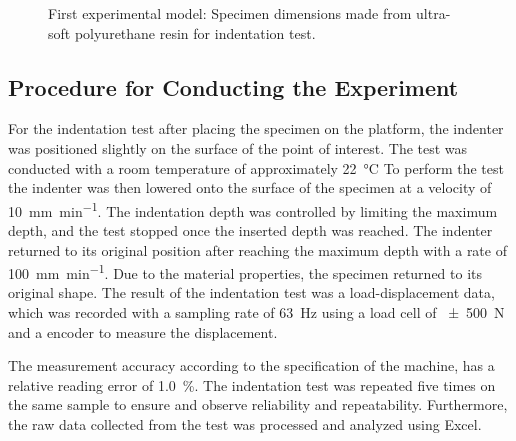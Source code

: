 \begin{figure}%
    \centering
   \qquad
   \caption{First experimental model: Specimen dimensions made from ultra-soft polyurethane resin for indentation test.}%
   \label{fig:specimenhole}%
\end{figure}

\subsection*{Procedure for Conducting the Experiment}
For the indentation test after placing the specimen on the platform,
the indenter was positioned slightly on the surface of the point of interest. 
The test was conducted with a room temperature of approximately \SI{22}{\degreeCelsius}
To perform the test the indenter was then lowered onto the surface of the specimen
at a velocity of \SI[per-mode = symbol]{10}{\milli \m\per \minute}.
The indentation depth was controlled by limiting the maximum depth, and the 
test stopped once the inserted depth was reached. The indenter returned to its 
original position after reaching the maximum depth with a rate of 
\SI[per-mode = symbol]{100}{\milli \m\per \minute}. Due to the material properties,
the specimen returned to its original shape.
The result of the indentation test was a load-displacement data,
which was recorded with a sampling rate of \SI{63}{\hertz} using a load 
cell of \SI{\pm 500}{\newton} and a encoder to measure the displacement.

The measurement accuracy according to the specification of the machine, has 
a relative reading error of \SI{1.0}{\percent}. The indentation test 
was repeated five times on the same sample to ensure and observe 
reliability and repeatability. Furthermore, the raw data collected from the test 
was processed and analyzed using Excel.\\

